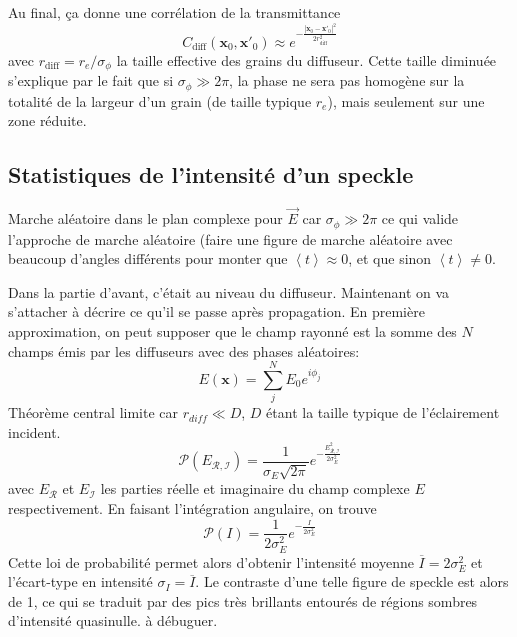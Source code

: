 Au final, ça donne une corrélation de la transmittance 
\begin{equation}
C_{\mathrm{diff}}(\mathbf{x}_0,\mathbf{x}'_0)\approx e^{-\frac{\left| \mathbf{x}_0 - \mathbf{x}'_0 \right| ^2}{2 r_{\mathrm{diff}}^2}}
\end{equation}
avec $r_{\mathrm{diff}} = r_e / \sigma_{\phi}$ la taille effective des grains du diffuseur. Cette taille diminuée s'explique par le fait que si $\sigma_{\phi} \gg 2\pi$, la phase ne sera pas homogène sur la totalité de la largeur d'un grain (de taille typique $r_e$), mais seulement sur une zone réduite. 




\subsection{Statistiques de l'intensité d'un speckle}
Marche aléatoire dans le plan complexe pour $\vec{E}$ car $\sigma_{\phi} \gg 2\pi$ ce qui valide l'approche de marche aléatoire (faire une figure de marche aléatoire avec beaucoup d'angles différents pour monter que $\left\langle t \right\rangle\approx 0$, et que sinon $\left\langle t \right\rangle\neq 0$.

Dans la partie d'avant, c'était au niveau du diffuseur. Maintenant on va s'attacher à décrire ce qu'il se passe après propagation. 
En première approximation, on peut supposer que le champ rayonné est la somme des $N$ champs émis par les diffuseurs avec des phases aléatoires:
\begin{equation}
E(\mathbf{x})=\sum_{j}^{N} E_0 e^{i \phi_j}
\end{equation}
Théorème central limite car $r_{diff} \ll D$, $D$ étant la taille typique de l'éclairement incident.
\begin{equation}
\mathcal{P}(E_{\mathcal{R,I}})=\frac{1}{\sigma_E\sqrt{2\pi}} e^{-\frac{E_{\mathcal{R,I}}^2}{2 \sigma_E^2}}
\end{equation}
avec $E_{\mathcal{R}}$ et $E_{\mathcal{I}}$ les parties réelle et imaginaire du champ complexe $E$ respectivement. En faisant l'intégration angulaire, on trouve 
\begin{equation}
\mathcal{P}(I)=\frac{1}{2\sigma_E^2}e^{-\frac{I}{2\sigma_E^2}}
\end{equation}
Cette loi de probabilité permet alors d'obtenir l'intensité moyenne $\overline{I}=2\sigma_E^2$ et l'écart-type en intensité $\sigma_I=\overline{I}$. Le contraste d'une telle figure de speckle est alors de 1, ce qui se traduit par des pics très brillants entourés de régions sombres d'intensité quasinulle. à débuguer.


